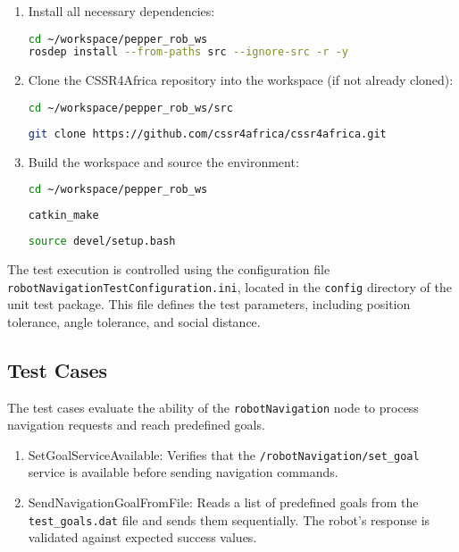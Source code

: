 \documentclass{CSSRforAfrica}
\begin{document}
\begin{enumerate}
\item Install all necessary dependencies:
\begin{lstlisting}[style=withoutNumbering, language=bash]
cd ~/workspace/pepper_rob_ws
rosdep install --from-paths src --ignore-src -r -y
\end{lstlisting}

\item Clone the CSSR4Africa repository into the workspace (if not already cloned):
\begin{lstlisting}[style=withoutNumbering, language=bash]
cd ~/workspace/pepper_rob_ws/src
\end{lstlisting}
\begin{lstlisting}[style=withoutNumbering, language=bash]
git clone https://github.com/cssr4africa/cssr4africa.git
\end{lstlisting}
\item Build the workspace and source the environment:
\begin{lstlisting}[style=withoutNumbering, language=bash]
cd ~/workspace/pepper_rob_ws
\end{lstlisting}

\begin{lstlisting}[style=withoutNumbering, language=bash]
catkin_make
\end{lstlisting}

\begin{lstlisting}[style=withoutNumbering, language=bash]
source devel/setup.bash
\end{lstlisting}
\end{enumerate}

\noindent The test execution is controlled using the configuration file \texttt{robotNavigationTestConfiguration.ini}, located in the \texttt{config} directory of the unit test package. This file defines the test parameters, including position tolerance, angle tolerance, and social distance.

\subsection{Test Cases}
The test cases evaluate the ability of the \texttt{robotNavigation} node to process navigation requests and reach predefined goals.

\begin{enumerate}
    \item SetGoalServiceAvailable: Verifies that the \texttt{/robotNavigation/set\_goal} service is available before sending navigation commands.
    \item SendNavigationGoalFromFile: Reads a list of predefined goals from the \texttt{test\_goals.dat} file and sends them sequentially. The robot's response is validated against expected success values.
\end{enumerate}
\end{document}
